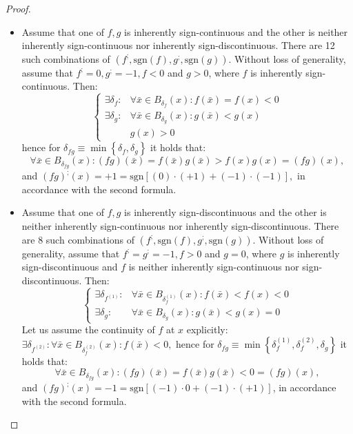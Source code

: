 \documentclass[11pt]{book}
\begin{document}
\begin{proof}
\begin{enumerate}
\begin{itemize}
\item Assume that one of $f,g$ is inherently sign-continuous and the other is neither inherently sign-continuous nor inherently sign-discontinuous. There are 12 such combinations of $\left(f^{;},\text{sgn}\left(f\right),g^{;},\text{sgn}\left(g\right)\right)$. Without loss of generality, assume that $f^{;}=0,g^{;}=-1,f < 0$ and $g > 0$, where $f$ is inherently sign-continuous. Then: $$\begin{cases} \exists\delta_{f}: & \forall\bar{x}\in B_{\delta_{f}}\left(x\right):f\left(\bar{x}\right)=f\left(x\right) < 0\\ \exists\delta_{g}: & \forall\bar{x}\in B_{\delta_{g}}\left(x\right):g\left(\bar{x}\right)< g\left(x\right)\\ & g\left(x\right) > 0 \end{cases}$$ hence for $\delta_{fg}\equiv\min\left\{ \delta_{f},\delta_{g}\right\}$ it holds that: $$\forall\bar{x}\in B_{\delta_{fg}}\left(x\right):\left(fg\right)\left(\bar{x}\right)=f\left(\bar{x}\right)g\left(\bar{x}\right) > f\left(x\right)g\left(x\right)=\left(fg\right)\left(x\right),$$ and $\left(fg\right)^{;}\left(x\right)=+1=\text{sgn}\left[\left(0\right)\cdot\left(+1\right)+\left(-1\right)\cdot\left(-1\right)\right],$ in accordance with the second formula.
\item Assume that one of $f,g$ is inherently sign-discontinuous and the other is neither inherently sign-continuous nor inherently sign-discontinuous. There are 8 such combinations of $\left(f^{;},\text{sgn}\left(f\right),g^{;},\text{sgn}\left(g\right)\right)$. Without loss of generality, assume that $f^{;}=g^{;}=-1,f>0$ and $g=0$, where $g$ is inherently sign-discontinuous and $f$ is neither inherently sign-continuous nor sign-discontinuous. Then: $$\begin{cases} \exists\delta_{f^{\left(1\right)}}: & \forall\bar{x}\in B_{\delta_{f}^{\left(1\right)}}\left(x\right):f\left(\bar{x}\right) < f\left(x\right) < 0\\ \exists\delta_{g}: & \forall\bar{x}\in B_{\delta_{g}}\left(x\right):g\left(\bar{x}\right) < g\left(x\right)=0 \end{cases}$$ Let us assume the continuity of $f$ at $x$ explicitly: $\exists\delta_{f^{\left(2\right)}}:\forall\bar{x}\in B_{\delta_{f}^{\left(2\right)}}\left(x\right):f\left(\bar{x}\right) < 0,$ hence for $\delta_{fg}\equiv\min\left\{ \delta_{f}^{\left(1\right)},\delta_{f}^{\left(2\right)},\delta_{g}\right\}$ it holds that: $$\forall\bar{x}\in B_{\delta_{fg}}\left(x\right):\left(fg\right)\left(\bar{x}\right)=f\left(\bar{x}\right)g\left(\bar{x}\right)< 0=\left(fg\right)\left(x\right),$$ and $\left(fg\right)^{;}\left(x\right)=-1=\text{sgn}\left[\left(-1\right)\cdot0+\left(-1\right)\cdot\left(+1\right)\right]$, in accordance with the second formula.


\end{itemize}
\end{enumerate}
\end{proof}
\end{document}

